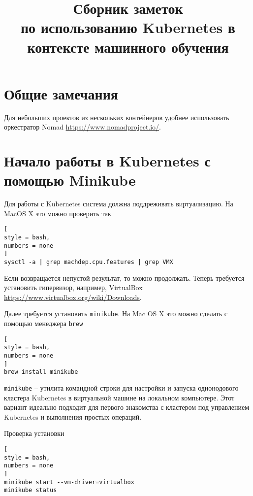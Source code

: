 \documentclass[%
	11pt,
	a4paper,
	utf8,
		]{article}
\begin{document}
\title{Сборник заметок\\по использованию Kubernetes в контексте машинного обучения}

\author{}

\date{}
\maketitle

\thispagestyle{fancy}

\tableofcontents


\section{Общие замечания}

Для небольших проектов из нескольких контейнеров удобнее использовать оркестратор Nomad \url{https://www.nomadproject.io/}.


\section{Начало работы в Kubernetes с помощью Minikube}

Для работы с Kubernetes система должна поддреживать виртуализацию. На MacOS X это можно проверить так
\begin{lstlisting}[
style = bash,
numbers = none
]
sysctl -a | grep machdep.cpu.features | grep VMX
\end{lstlisting}

Если возвращается непустой результат, то можно продолжать. Теперь требуется установить гипервизор, например, VirtualBox \url{https://www.virtualbox.org/wiki/Downloads}.

Далее требуется установить \texttt{minikube}. На Mac OS X это можно сделать с помощью менеджера \texttt{brew}
\begin{lstlisting}[
style = bash,
numbers = none	
]
brew install minikube
\end{lstlisting}

\texttt{minikube} -- утилита командной строки для настройки и запуска однонодового кластера Kubernetes в виртуальной машине на локальном компьютере. Этот вариант идеально подходит для первого знакомства с кластером под управлением Kubernetes и выполнения простых операций.

Проверка установки
\begin{lstlisting}[
style = bash,
numbers = none	
]
minikube start --vm-driver=virtualbox
minikube status
\end{lstlisting}
\end{document}
